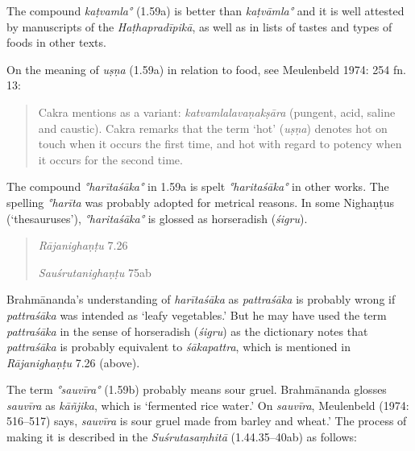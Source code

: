 \begin{ekdosis}
\begin{testimonia}[hp01_059]
\end{testimonia}

\begin{philcomm}[hp01_059]
The compound \emph{kaṭvamla°} (1.59a) is better than \emph{kaṭvāmla°} and it is well attested by manuscripts of the \emph{Haṭhapradīpikā}, as well as in lists of tastes and types of foods in other texts.

On the meaning of \emph{uṣṇa} (1.59a) in relation to food, see Meulenbeld 1974: 254 fn. 13:
\begin{quote}
Cakra mentions as a variant: \emph{katvamlalavaṇakṣāra} (pungent, acid, saline and caustic). Cakra remarks that the term `hot' (\emph{uṣṇa}) denotes hot on touch when it occurs the first time, and hot with regard to potency when it occurs for the second time.
\end{quote}

The compound \emph{°harītaśāka°} in 1.59a is spelt \emph{°haritaśāka°} in other works. The spelling \emph{°harīta} was probably adopted for metrical reasons. In some Nighaṇṭus (`thesauruses'), \emph{°haritaśāka°} is glossed as horseradish (\emph{śigru}).
\begin{quote}
\emph{Rājanighaṇṭu} 7.26

\begin{versinnote}
\end{versinnote}
\emph{Sauśrutanighaṇṭu} 75ab
\begin{versinnote}
\end{versinnote}
\end{quote}

Brahmānanda’s understanding of \emph{harītaśāka} as \emph{pattraśāka} is probably wrong if \emph{pattraśāka} was intended as ‘leafy vegetables.’ But he may have used the term \emph{pattraśāka} in the sense of horseradish (\emph{śigru}) as the dictionary notes that \emph{pattraśāka} is probably equivalent to \emph{śākapattra}, which is mentioned in \emph{Rājanighaṇṭu} 7.26 (above).

The term \emph{°sauvīra°} (1.59b) probably means sour gruel. Brahmānanda glosses  \emph{sauvīra} as \emph{kāñjika}, which is `fermented rice water.' On \emph{sauvīra}, Meulenbeld (1974: 516–517) says, \emph{sauvīra} is sour gruel made from barley and wheat.' The process of making it is described in the \emph{Suśrutasaṃhitā} (1.44.35--40ab) as follows:


\end{philcomm}
\end{ekdosis}

